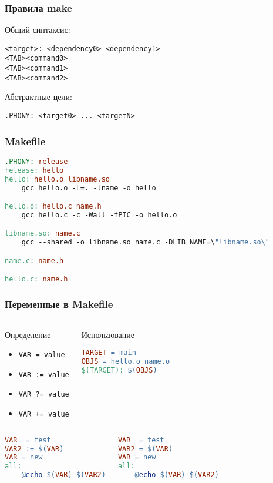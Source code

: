 \begin{frame}[fragile]
	\frametitle{Правила make}

	Общий синтаксис:
	\begin{verbatim}
<target>: <dependency0> <dependency1>
<TAB><command0>
<TAB><command1>
<TAB><command2>
	\end{verbatim}

	Абстрактные цели:
	\begin{verbatim}
.PHONY: <target0> ... <targetN>
	\end{verbatim}
\end{frame}

\begin{frame}[fragile]
	\frametitle{Makefile}

	\begin{lstlisting}[language=make]
.PHONY: release
release: hello
hello: hello.o libname.so
    gcc hello.o -L=. -lname -o hello

hello.o: hello.c name.h
    gcc hello.c -c -Wall -fPIC -o hello.o

libname.so: name.c
    gcc --shared -o libname.so name.c -DLIB_NAME=\"libname.so\"

name.c: name.h

hello.c: name.h
	\end{lstlisting}
\end{frame}

\begin{frame}[fragile]
    \frametitle{Переменные в Makefile}
    \begin{columns}
    \begin{block}{Определение}
    \begin{itemize}
	\item {\tt VAR = value}
	\item {\tt VAR := value}
	\item {\tt VAR ?= value}
	\item {\tt VAR += value}
    \end{itemize}
    \end{block}

    \begin{block}{Использование}
	\begin{lstlisting}[language=make]
TARGET = main
OBJS = hello.o name.o
$(TARGET): $(OBJS)
	\end{lstlisting}
    \end{block}
    \end{columns}

    \pause
    \begin{columns}
	\begin{lstlisting}[language=make]
VAR  = test
VAR2 := $(VAR)
VAR = new
all:
	@echo $(VAR) $(VAR2)
	\end{lstlisting}

	\begin{lstlisting}[language=make]
VAR  = test
VAR2 = $(VAR)
VAR = new
all:
	@echo $(VAR) $(VAR2)
	\end{lstlisting}
    \end{columns}
    
\end{frame}

